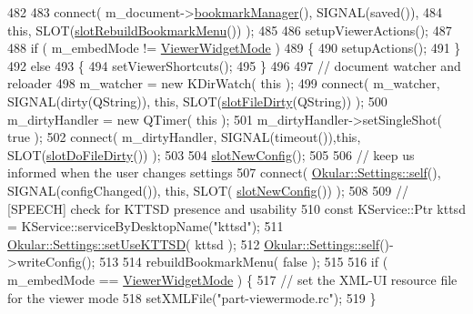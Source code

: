 \begin{DoxyCode}
{482 
483     connect( m\_document->\hyperlink{classOkular_1_1Document_a2a2a1f0f5384563c8b24c2ba48809839}{bookmarkManager}(), SIGNAL(saved()),
484         \textcolor{keyword}{this}, SLOT(\hyperlink{classOkular_1_1Part_a37027ec2955fe4e9d390a086119a23a4}{slotRebuildBookmarkMenu}()) );
485 
486     setupViewerActions();
487 
488     \textcolor{keywordflow}{if} ( m\_embedMode != \hyperlink{namespaceOkular_adbe21e337d65d3f5f07a441180428ba8aebaf7bae8bd4303bad7c4ca29057c472}{ViewerWidgetMode} )
489     \{
490         setupActions();
491     \}
492     \textcolor{keywordflow}{else}
493     \{
494         setViewerShortcuts();
495     \}
496 
497     \textcolor{comment}{// document watcher and reloader}
498     m\_watcher = \textcolor{keyword}{new} KDirWatch( \textcolor{keyword}{this} );
499     connect( m\_watcher, SIGNAL(dirty(QString)), \textcolor{keyword}{this}, SLOT(\hyperlink{classOkular_1_1Part_a86e879053e139d53fc24b41daac5698e}{slotFileDirty}(QString)) );
500     m\_dirtyHandler = \textcolor{keyword}{new} QTimer( \textcolor{keyword}{this} );
501     m\_dirtyHandler->setSingleShot( \textcolor{keyword}{true} );
502     connect( m\_dirtyHandler, SIGNAL(timeout()),\textcolor{keyword}{this}, SLOT(\hyperlink{classOkular_1_1Part_add3657962f39603d07fb63c74d5f57dc}{slotDoFileDirty}()) );
503 
504     \hyperlink{classOkular_1_1Part_a19b3133f95b677e0f5a17fc0d3cae8c2}{slotNewConfig}();
505 
506     \textcolor{comment}{// keep us informed when the user changes settings}
507     connect( \hyperlink{classOkular_1_1Settings_ae6f72bd2023f2f684f59bca5dde6617c}{Okular::Settings::self}(), SIGNAL(configChanged()), \textcolor{keyword}{this}, SLOT(
      \hyperlink{classOkular_1_1Part_a19b3133f95b677e0f5a17fc0d3cae8c2}{slotNewConfig}()) );
508 
509     \textcolor{comment}{// [SPEECH] check for KTTSD presence and usability}
510     \textcolor{keyword}{const} KService::Ptr kttsd = KService::serviceByDesktopName(\textcolor{stringliteral}{"kttsd"});
511     \hyperlink{classOkular_1_1Settings_a262aea332741613d596985c6775068f9}{Okular::Settings::setUseKTTSD}( kttsd );
512     \hyperlink{classOkular_1_1Settings_ae6f72bd2023f2f684f59bca5dde6617c}{Okular::Settings::self}()->writeConfig();
513 
514     rebuildBookmarkMenu( \textcolor{keyword}{false} );
515 
516     \textcolor{keywordflow}{if} ( m\_embedMode == \hyperlink{namespaceOkular_adbe21e337d65d3f5f07a441180428ba8aebaf7bae8bd4303bad7c4ca29057c472}{ViewerWidgetMode} ) \{
517         \textcolor{comment}{// set the XML-UI resource file for the viewer mode}
518         setXMLFile(\textcolor{stringliteral}{"part-viewermode.rc"});
519     \}
}
\end{DoxyCode}
